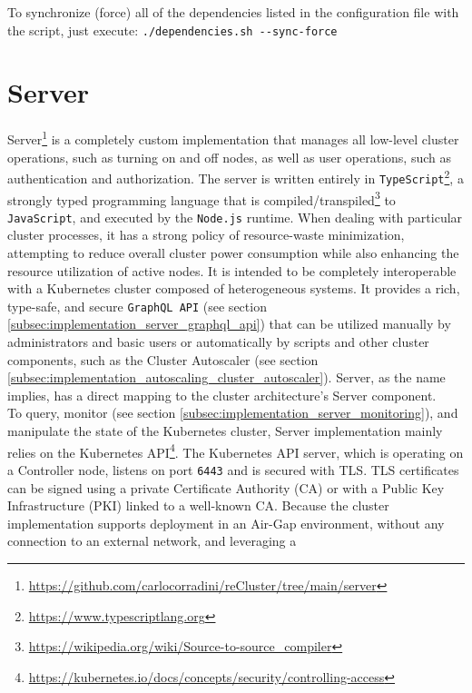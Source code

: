 To synchronize (force) all of the dependencies listed in the configuration file with
the script, just execute: \lstinline[language=shell, alsoletter={.-}, morekeywords={[2]{dependencies.sh}},
morekeywords={[3]{--sync-force}}]{./dependencies.sh --sync-force}

\section{Server}
\label{sec:implementation_server}

Server\footnote{\url{https://github.com/carlocorradini/reCluster/tree/main/server}}
is a completely custom implementation that manages all low-level cluster
operations, such as turning on and off nodes, as well as user operations, such as
authentication and authorization. The server is written entirely in \texttt{TypeScript}\footnote{\url{https://www.typescriptlang.org}},
a strongly typed programming language that is compiled/transpiled\footnote{\url{https://wikipedia.org/wiki/Source-to-source_compiler}}
to \texttt{JavaScript}, and executed by the \texttt{Node.js} runtime. When
dealing with particular cluster processes, it has a strong policy of resource-waste
minimization, attempting to reduce overall cluster power consumption while also
enhancing the resource utilization of active nodes. It is intended to be completely
interoperable with a Kubernetes cluster composed of heterogeneous systems. It
provides a rich, type-safe, and secure \texttt{GraphQL API} (see section
\ref{subsec:implementation_server_graphql_api}) that can be utilized manually by
administrators and basic users or automatically by scripts and other cluster components,
such as the Cluster Autoscaler (see section \ref{subsec:implementation_autoscaling_cluster_autoscaler}).
Server, as the name implies, has a direct mapping to the cluster architecture's Server
component. \\ %
To query, monitor (see section \ref{subsec:implementation_server_monitoring}), and
manipulate the state of the Kubernetes cluster, Server implementation mainly
relies on the Kubernetes API\footnote{\url{https://kubernetes.io/docs/concepts/security/controlling-access}}.
The Kubernetes API server, which is operating on a Controller node, listens on port
\texttt{6443} and is secured with TLS. TLS certificates can be signed using a private
Certificate Authority (CA) or with a Public Key Infrastructure (PKI) linked to a
well-known CA. Because the cluster implementation supports deployment in an Air-Gap
environment, without any connection to an external network, and leveraging a
